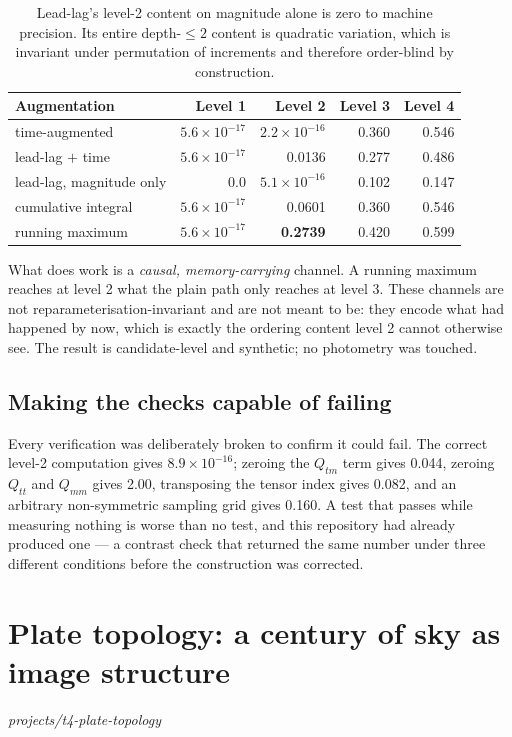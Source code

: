 \documentclass[11pt,a4paper]{report}
\begin{document}
\begin{table}[h]
\centering
\small
\begin{tabular}{lrrrr}
\toprule
Augmentation & Level 1 & Level 2 & Level 3 & Level 4 \\
\midrule
time-augmented & $5.6\times10^{-17}$ & $2.2\times10^{-16}$ & 0.360 & 0.546 \\
lead-lag $+$ time & $5.6\times10^{-17}$ & 0.0136 & 0.277 & 0.486 \\
lead-lag, magnitude only & 0.0 & $5.1\times10^{-16}$ & 0.102 & 0.147 \\
cumulative integral & $5.6\times10^{-17}$ & 0.0601 & 0.360 & 0.546 \\
running maximum & $5.6\times10^{-17}$ & \textbf{0.2739} & 0.420 & 0.599 \\
\bottomrule
\end{tabular}
\caption{Lead-lag's level-2 content on magnitude alone is zero to machine precision. Its
entire depth-$\leq 2$ content is quadratic variation, which is invariant under permutation of
increments and therefore order-blind by construction.}
\end{table}

What does work is a \emph{causal, memory-carrying} channel. A running maximum reaches at
level 2 what the plain path only reaches at level 3. These channels are not
reparameterisation-invariant and are not meant to be: they encode what had happened by now,
which is exactly the ordering content level 2 cannot otherwise see. The result is
candidate-level and synthetic; no photometry was touched.

\section{Making the checks capable of failing}

Every verification was deliberately broken to confirm it could fail. The correct level-2
computation gives $8.9\times10^{-16}$; zeroing the $Q_{tm}$ term gives 0.044, zeroing
$Q_{tt}$ and $Q_{mm}$ gives 2.00, transposing the tensor index gives 0.082, and an arbitrary
non-symmetric sampling grid gives 0.160. A test that passes while measuring nothing is worse
than no test, and this repository had already produced one --- a contrast check that returned
the same number under three different conditions before the construction was corrected.


\chapter{Plate topology: a century of sky as image structure}
\label{ch:t4}
\noindent\textit{projects/t4-plate-topology}
\end{document}

